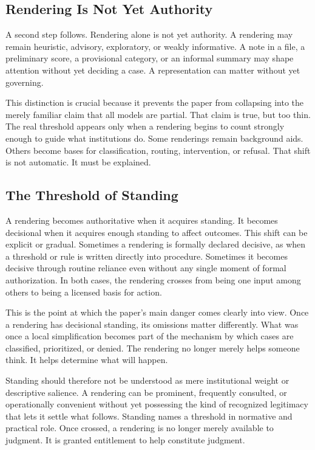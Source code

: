 \documentclass[11pt]{article}
\begin{document}
\subsection{Rendering Is Not Yet Authority}

A second step follows. Rendering alone is not yet authority. A rendering may remain heuristic, advisory, exploratory, or weakly informative. A note in a file, a preliminary score, a provisional category, or an informal summary may shape attention without yet deciding a case. A representation can matter without yet governing.

This distinction is crucial because it prevents the paper from collapsing into the merely familiar claim that all models are partial. That claim is true, but too thin. The real threshold appears only when a rendering begins to count strongly enough to guide what institutions do. Some renderings remain background aids. Others become bases for classification, routing, intervention, or refusal. That shift is not automatic. It must be explained.

\subsection{The Threshold of Standing}

A rendering becomes authoritative when it acquires standing. It becomes decisional when it acquires enough standing to affect outcomes. This shift can be explicit or gradual. Sometimes a rendering is formally declared decisive, as when a threshold or rule is written directly into procedure. Sometimes it becomes decisive through routine reliance even without any single moment of formal authorization. In both cases, the rendering crosses from being one input among others to being a licensed basis for action.

This is the point at which the paper's main danger comes clearly into view. Once a rendering has decisional standing, its omissions matter differently. What was once a local simplification becomes part of the mechanism by which cases are classified, prioritized, or denied. The rendering no longer merely helps someone think. It helps determine what will happen.

Standing should therefore not be understood as mere institutional weight or descriptive salience. A rendering can be prominent, frequently consulted, or operationally convenient without yet possessing the kind of recognized legitimacy that lets it settle what follows. Standing names a threshold in normative and practical role. Once crossed, a rendering is no longer merely available to judgment. It is granted entitlement to help constitute judgment.
\end{document}
